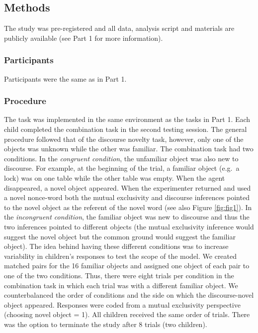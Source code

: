 \documentclass[
  man,floatsintext]{apa6}
\begin{document}
\hypertarget{methods-1}{%
\subsection{Methods}\label{methods-1}}

The study was pre-registered and all data, analysis script and materials are publicly available (see Part 1 for more information).

\hypertarget{participants-1}{%
\subsubsection{Participants}\label{participants-1}}

Participants were the same as in Part 1.

\hypertarget{procedure}{%
\subsubsection{Procedure}\label{procedure}}

The task was implemented in the same environment as the tasks in Part 1. Each child completed the combination task in the second testing session. The general procedure followed that of the discourse novelty task, however, only one of the objects was unknown while the other was familiar. The combination task had two conditions. In the \emph{congruent condition}, the unfamiliar object was also new to discourse. For example, at the beginning of the trial, a familiar object (e.g.~a lock) was on one table while the other table was empty. When the agent disappeared, a novel object appeared. When the experimenter returned and used a novel nonce-word both the mutual exclusivity and discourse inferences pointed to the novel object as the referent of the novel word (see also Figure \ref{fig:fig1}). In the \emph{incongruent condition}, the familiar object was new to discourse and thus the two inferences pointed to different objects (the mutual exclusivity inference would suggest the novel object but the common ground would suggest the familiar object). The idea behind having these different conditions was to increase variability in children's responses to test the scope of the model. We created matched pairs for the 16 familiar objects and assigned one object of each pair to one of the two conditions. Thus, there were eight trials per condition in the combination task in which each trial was with a different familiar object. We counterbalanced the order of conditions and the side on which the discourse-novel object appeared. Responses were coded from a mutual exclusivity perspective (choosing novel object = 1). All children received the same order of trials. There was the option to terminate the study after 8 trials (two children).
\end{document}
